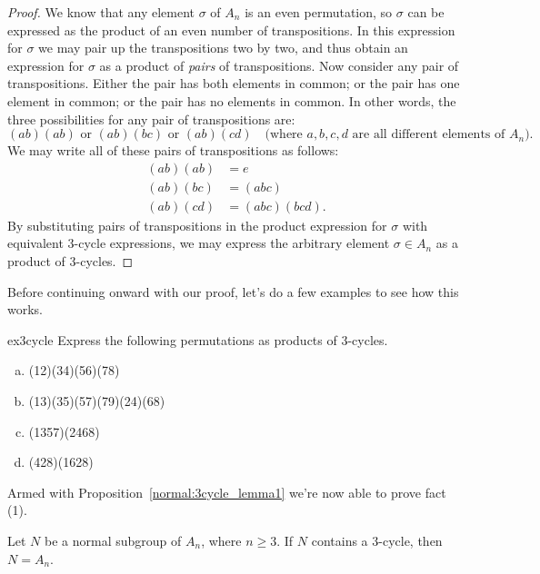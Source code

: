 {\begin{proof}
We know that any element $\sigma$ of $A_n$ is an even permutation, so $\sigma$ can be expressed as the product of an even number of transpositions. In this  expression for $\sigma$ we may pair up the transpositions two by two, and thus obtain an expression for $\sigma$ as a product of \emph{pairs} of transpositions. Now consider any pair of transpositions. Either the pair has both elements in common; or the pair has one element in common; or the pair has no elements in common. In other words, the three possibilities for any pair of transpositions are:
\[ (ab)(ab) \text{ or } (ab)(bc)  \text{ or } (ab)(cd) \quad \text{(where } a,b,c,d \text{ are all different elements of } A_n).\]
We may write all of these pairs of transpositions as follows:
\begin{align*}
(ab)(ab) & = e \\
(ab)(bc) & = (abc) \\
(ab)(cd) & = (abc)(bcd).
\end{align*}
By substituting pairs of transpositions in the product expression for $\sigma$ with equivalent 3-cycle expressions, we may express the arbitrary element $\sigma \in A_n$ as a product of 3-cycles.
\end{proof}

Before continuing onward with our proof, let's do a few examples to see how this works.

 \begin{exercise}{ex3cycle}
 Express the following permutations as products of 3-cycles.
\begin{enumerate}[(a)]
\item 
(12)(34)(56)(78)
\item 
(13)(35)(57)(79)(24)(68)
\item 
(1357)(2468)
\item 
(428)(1628)
\end{enumerate}
 \end{exercise}
Armed with Proposition~\ref{normal:3cycle_lemma1} we're now able to prove fact (1).

\begin{thm}\label{normal:3cycle_lemma2}
Let $N$ be a  normal subgroup of $A_n$, where $n \geq 3$. If $N$ 
contains a $3$-cycle, then $N = A_n$. 
\end{thm}
 
}
